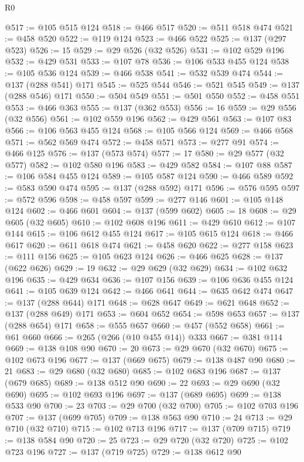 \begin{lexlean}{R0}
\begin{coremodule}
@517 := @105 @515 @124
@518 := @466 @517
@520 := @511 @518 @474
@521 := @458 @520
@522 := @119 @124
@523 := @466 @522
@525 := @137 (@297 @523)
@526 := 15
@529 := @29 @526 (@32 @526)
@531 := @102 @529 @196
@532 := @429 @531
@533 := @107 @78
@536 := @106 @533 @455 @124
@538 := @105 @536 @124
@539 := @466 @538
@541 := @532 @539 @474
@544 := @137 (@288 @541) @171
@545 := @525 @544
@546 := @521 @545
@549 := @137 (@288 @546) @171
@550 := @504 @549
@551 := @501 @550
@552 := @458 @551
@553 := @466 @363
@555 := @137 (@362 @553)
@556 := 16
@559 := @29 @556 (@32 @556)
@561 := @102 @559 @196
@562 := @429 @561
@563 := @107 @83
@566 := @106 @563 @455 @124
@568 := @105 @566 @124
@569 := @466 @568
@571 := @562 @569 @474
@572 := @458 @571
@573 := @277 @91
@574 := @466 @125
@576 := @137 (@573 @574)
@577 := 17
@580 := @29 @577 (@32 @577)
@582 := @102 @580 @196
@583 := @429 @582
@584 := @107 @88
@587 := @106 @584 @455 @124
@589 := @105 @587 @124
@590 := @466 @589
@592 := @583 @590 @474
@595 := @137 (@288 @592) @171
@596 := @576 @595
@597 := @572 @596
@598 := @458 @597
@599 := @277 @146
@601 := @105 @148 @124
@602 := @466 @601
@604 := @137 (@599 @602)
@605 := 18
@608 := @29 @605 (@32 @605)
@610 := @102 @608 @196
@611 := @429 @610
@612 := @107 @144
@615 := @106 @612 @455 @124
@617 := @105 @615 @124
@618 := @466 @617
@620 := @611 @618 @474
@621 := @458 @620
@622 := @277 @158
@623 := @111 @156
@625 := @105 @623 @124
@626 := @466 @625
@628 := @137 (@622 @626)
@629 := 19
@632 := @29 @629 (@32 @629)
@634 := @102 @632 @196
@635 := @429 @634
@636 := @107 @156
@639 := @106 @636 @455 @124
@641 := @105 @639 @124
@642 := @466 @641
@644 := @635 @642 @474
@647 := @137 (@288 @644) @171
@648 := @628 @647
@649 := @621 @648
@652 := @137 (@288 @649) @171
@653 := @604 @652
@654 := @598 @653
@657 := @137 (@288 @654) @171
@658 := @555 @657
@660 := @457 (@552 @658)
@661 := @61 @660
@666 := @265 (@266 (@10 @455 @14)) @333
@667 := @381 @114
@669 := @138 @108 @90
@670 := 20
@673 := @29 @670 (@32 @670)
@675 := @102 @673 @196
@677 := @137 (@669 @675)
@679 := @138 @487 @90
@680 := 21
@683 := @29 @680 (@32 @680)
@685 := @102 @683 @196
@687 := @137 (@679 @685)
@689 := @138 @512 @90
@690 := 22
@693 := @29 @690 (@32 @690)
@695 := @102 @693 @196
@697 := @137 (@689 @695)
@699 := @138 @533 @90
@700 := 23
@703 := @29 @700 (@32 @700)
@705 := @102 @703 @196
@707 := @137 (@699 @705)
@709 := @138 @563 @90
@710 := 24
@713 := @29 @710 (@32 @710)
@715 := @102 @713 @196
@717 := @137 (@709 @715)
@719 := @138 @584 @90
@720 := 25
@723 := @29 @720 (@32 @720)
@725 := @102 @723 @196
@727 := @137 (@719 @725)
@729 := @138 @612 @90

\end{coremodule}
\end{lexlean}
